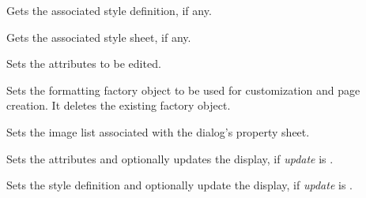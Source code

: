 
Gets the associated style definition, if any.

\label{wxrichtextformattingdialoggetstylesheet}


Gets the associated style sheet, if any.

\label{wxrichtextformattingdialogsetattributes}


Sets the attributes to be edited.

\label{wxrichtextformattingdialogsetformattingdialogfactory}


Sets the formatting factory object to be used for customization and page creation.
It deletes the existing factory object.

\label{wxrichtextformattingdialogsetimagelist}


Sets the image list associated with the dialog's property sheet.

\label{wxrichtextformattingdialogsetstyle}


Sets the attributes and optionally updates the display, if {\it update} is \true.

\label{wxrichtextformattingdialogsetstyledefinition}


Sets the style definition and optionally update the display, if {\it update} is \true.

\label{wxrichtextformattingdialogupdatedisplay}

